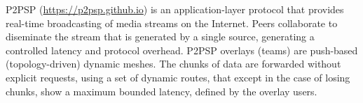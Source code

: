 P2PSP (\url{https://p2psp.github.io}) is an application-layer protocol
that provides real-time broadcasting of media streams on the
Internet. Peers collaborate to diseminate the stream that is generated
by a single source, generating a controlled latency and protocol
overhead. P2PSP overlays (teams) are push-based (topology-driven)
dynamic meshes. The chunks of data are forwarded without explicit
requests, using a set of dynamic routes, that except in the case of
losing chunks, show a maximum bounded latency, defined by the overlay
users.
